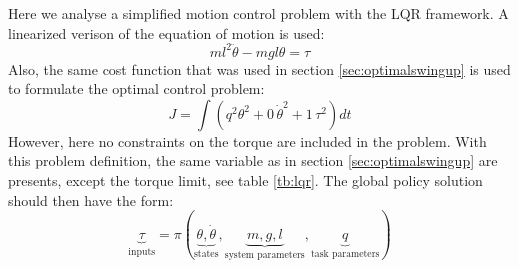 Here we analyse a simplified motion control problem with the LQR framework. A linearized verison of the equation of motion is used:
\begin{equation}
ml^2 \ddot{\theta} - mgl \theta = \tau
\label{eq:pendulum_dynamics_lqr}
\end{equation}
Also, the same cost function that was used in section \ref{sec:optimalswingup} is used to formulate the optimal control problem:
\begin{equation}
J = \int{( q^2 \theta^2 + 0 \, \dot{\theta}^2 + 1 \, \tau^2 ) dt }
\label{eq:pendulum_cost_lqr}
\end{equation}
However, here no constraints on the torque are included in the problem. With this problem definition, the same variable as in section \ref{sec:optimalswingup} are presents, except the torque limit, see table \ref{tb:lqr}. The global policy solution should then have the form:
\begin{equation}
\underbrace{\tau}_{\text{inputs}}
=
\pi \left(
\underbrace{ \theta, \dot{\theta} }_{\text{states}},
\underbrace{ m , g , l }_{\text{system parameters}},
\underbrace{ q }_{\text{task parameters}}
\right)
\label{eq:lqr_policy_form}
\end{equation}
